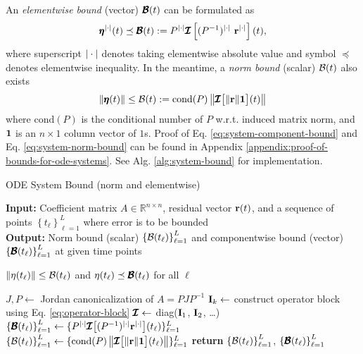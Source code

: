     An \textit{elementwise bound} (vector) $\pmb{\mathcal{B}}(t)$ can be formulated as 
    {
        \begin{equation}\label{eq:system-component-bound}
            \pmb{\eta}^{|\cdot|}(t) \preceq \pmb{\mathcal{B}}(t) := P^{|\cdot|} \pmb{\mathcal{I}}\left[(P^{-1})^{|\cdot|} \ \mathbf{r}^{|\cdot|}\right](t),
        \end{equation}
    }
    where superscript $|\cdot|$ denotes taking elementwise absolute value and symbol $\preceq$ denotes elementwise inequality. In the meantime, a \textit{norm bound} (scalar) $\mathcal{B}(t)$ also exists
    {
        \begin{equation}\label{eq:system-norm-bound}
            \left\|\pmb{\eta}(t)\right\| \leq \mathcal{B}(t) := \mathrm{cond}(P)\left\|\pmb{\mathcal{I}}\big[\|\mathbf{r}\|\mathbf{1}\big](t)\right\|
        \end{equation}
    }
    where $\mathrm{cond}(P)$ is the conditional number of $P$ w.r.t. induced matrix norm, and $\mathbf{1}$ is an $n\times 1$ column vector of $1$s. 
    Proof of Eq. \eqref{eq:system-component-bound} and Eq. \eqref{eq:system-norm-bound} can be found in Appendix \ref{appendix:proof-of-bounds-for-ode-systems}.
    See Alg. \ref{alg:system-bound} for implementation.

    \begin{algorithm}
        \caption{ODE System Bound (norm and elementwise)}\label{alg:system-bound}
        \textbf{Input:} Coefficient matrix $A \in \mathbb{R}^{n\times n}$, residual vector $\mathbf{r}(t)$, and a sequence of points $\left\{t_\ell\right\}_{\ell=1}^{L}$ where error is to be bounded\\
        \textbf{Output:} Norm bound (scalar) $\left\{\mathcal{B}(t_\ell)\right\}_{\ell=1}^{L}$ and componentwise bound (vector) $\left\{\pmb{\mathcal{B}}(t_\ell)\right\}_{\ell=1}^{L}$ at given time points
        \begin{algorithmic}
            \Ensure $\|\eta(t_\ell)\| \leq \mathcal{B}(t_\ell)$ and $\eta(t_\ell) \preceq \pmb{\mathcal{B}}(t_\ell)$ for all $\ell$

            \State $J, P \gets $ Jordan canonicalization of $A = PJP^{-1}$
                \State $\mathbf{I}_k \gets$ construct operator block using Eq. \eqref{eq:operator-block} 
            \EndFor
            \State $\pmb{\mathcal{I}} \gets$ diag($\mathbf{I}_1$, $\mathbf{I}_2$,  \dots)
            \State $\left\{\pmb{\mathcal{B}}(t_\ell)\right\}_{\ell=1}^{L} \gets \{P^{|\cdot|} \pmb{\mathcal{I}}\big[(P^{-1})^{|\cdot|} \mathbf{r}^{|\cdot|}\big](t_\ell)\}_{\ell=1}^{L}$
            \State $\left\{\mathcal{B}(t_\ell)\right\}_{\ell=1}^{L} \gets \{\mathrm{cond}(P)\left\|\pmb{\mathcal{I}}\big[\|\mathbf{r}\|\mathbf{1}\big](t_\ell)\right\|\}_{\ell=1}^{L}$
            \State \textbf{return} $\left\{\mathcal{B}(t_\ell)\right\}_{\ell=1}^{L}$, $\left\{\pmb{\mathcal{B}}(t_\ell)\right\}_{\ell=1}^{L}$
        \end{algorithmic}
    \end{algorithm}

